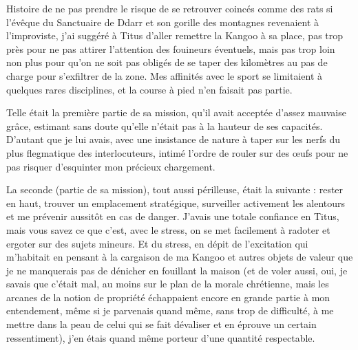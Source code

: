 Histoire de ne pas prendre le risque de se retrouver coincés comme des rats si l’évêque du Sanctuaire de Ddarr et son gorille des montagnes revenaient à l’improviste, j’ai suggéré à Titus d’aller remettre la Kangoo à sa place, pas trop près pour ne pas attirer l’attention des fouineurs éventuels, mais pas trop loin non plus pour qu’on ne soit pas obligés de se taper des kilomètres au pas de charge pour s’exfiltrer de la zone. Mes affinités avec le sport se limitaient à quelques rares disciplines, et la course à pied n’en faisait pas partie.

Telle était la première partie de sa mission, qu’il avait acceptée d’assez mauvaise grâce, estimant sans doute qu’elle n’était pas à la hauteur de ses capacités. D’autant que je lui avais, avec une insistance de nature à taper sur les nerfs du plus flegmatique des interlocuteurs, intimé l’ordre de rouler sur des œufs pour ne pas risquer d’esquinter mon précieux chargement.

La seconde (partie de sa mission), tout aussi périlleuse, était la suivante : rester en haut, trouver un emplacement stratégique, surveiller activement les alentours et me prévenir aussitôt en cas de danger. J’avais une totale confiance en Titus, mais vous savez ce que c’est, avec le stress, on se met facilement à radoter et ergoter sur des sujets mineurs. Et du stress, en dépit de l’excitation qui m’habitait en pensant à la cargaison de ma Kangoo et autres objets de valeur que je ne manquerais pas de dénicher en fouillant la maison (et de voler aussi, oui, je savais que c’était mal, au moins sur le plan de la morale chrétienne, mais les arcanes de la notion de propriété échappaient encore en grande partie à mon entendement, même si je parvenais quand même, sans trop de difficulté, à me mettre dans la peau de celui qui se fait dévaliser et en éprouve un certain ressentiment), j’en étais quand même porteur d’une quantité respectable.

